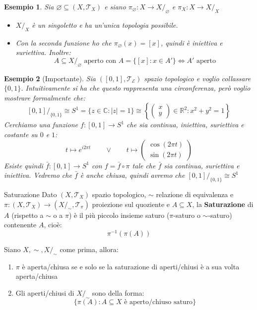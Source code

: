 \documentclass[11pt,a4paper,twoside]{article}
\newtheorem{es}{Esempio}
\theoremstyle{definition}
\begin{document}
\begin{es}
	Sia $\varnothing \subseteq (X, \mathcal T_X)$ e siano $\pi_\varnothing:X \to X/_\varnothing$ e $\pi_X:X \to X/_X$
	\begin{itemize}
		\item $X/_X$ è un singoletto e ha un'unica topologia possibile.
		\item Con la seconda funzione ho che $\pi_\varnothing (x) = [x]$, quindi è iniettiva e suriettiva. Inoltre:
			\[ A \subseteq X/_\varnothing \text{ aperto con }A = \{[x]:x \in A'\} \Leftrightarrow A'\text{ aperto}\]
	\end{itemize}
\end{es}

\begin{es}[Importante]
	Sia $([0,1], \mathcal T_\mathcal E)$ spazio topologico e voglio collassare $\{0,1\}$. Intuitivamente si ha che questo rappresenta una circonferenza, però voglio mostrare formalmente che:
	\[ [0,1]/_{\{0,1\}} \cong S^1 = \{z \in \mathbb C: |z|=1\} \cong \left\{\begin{pmatrix}x\\ y\end{pmatrix} \in \mathbb R^2: x^2 + y^2 = 1\right\} \]
	Cerchiamo una funzione $f:[0,1] \to S^1$ che sia continua, iniettiva, suriettiva e costante su $0$ e $1$:
	\[ t \mapsto e^{i 2 \pi t}\qquad \vee \qquad t \mapsto \begin{pmatrix} \cos(2 \pi t)\\ \sin(2 \pi t) \end{pmatrix}\]
	Esiste quindi $\bar f:[0,1]\to S^1$ con $f = \bar f \circ \pi$ tale che $\bar f$ sia continua, suriettiva e iniettiva. Vedremo che $\bar f$ è anche chiusa, quindi avremo che $[0,1]/_{\{0,1\}}\cong S^1$
\end{es}

\begin{defn}{Saturazione}{}
	Dato $(X, \mathcal T_X)$ spazio topologico, $\sim$ relazione di equivalenza e $\pi:(X, \mathcal T_X) \to (X/_\sim, \mathcal T_\pi)$ proiezione sul quoziente e $A\subseteq X$, la \textbf{Saturazione} di $A$ (rispetto a $\sim$ o a $\pi$) è il più piccolo insieme saturo ($\pi$-saturo o $\sim$-saturo) contenente $A$, cioè:
	\[ \pi^{-1}(\pi(A)) \]
\end{defn}

\begin{prop}{}{}
	Siano $X, \sim, X/_\sim$ come prima, allora:
	\begin{enumerate}
		\item $\pi$ è aperta/chiusa se e solo se la saturazione di aperti/chiusi è a sua volta aperta/chiusa
		\item Gli aperti/chiusi di $X/_\sim$ sono della forma:
			\[ \{\pi(A) : A \subseteq X \text{ è aperto/chiuso saturo}\} \]
	\end{enumerate}
\end{prop}
\end{document}
